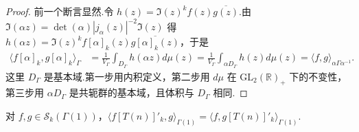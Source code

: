 \begin{proof}

前一个断言显然.令 $h(z)=\Im(z)^kf(z)\overline{g(z)}$.由 $\Im(\alpha z)=\det(\alpha)|j_\alpha(z)|^{-2}\Im(z)$ 得 $h(\alpha z)=\Im(z)^kf[\alpha]_k(z)\overline{g[\alpha]_k(z)}$，于是
\begin{align*}
\langle f[\alpha]_k,g[\alpha]_k\rangle_\Gamma
&=\frac1{V_\Gamma}\int_{D_\Gamma}h(\alpha z)d\mu(z)
=\frac1{V_\Gamma}\int_{\alpha D_\Gamma}h(z)d\mu(z)
=\langle f,g\rangle_{\alpha\Gamma\alpha^{-1}}.
\end{align*}
这里 $D_\Gamma$ 是基本域.第一步用内积定义，第二步用 $d\mu$ 在 $\mathrm{GL}_2(\mathbb R)_+$ 下的不变性，第三步用 $\alpha D_\Gamma$ 是共轭群的基本域，且体积与 $D_\Gamma$ 相同.

\end{proof}

\begin{proposition*}

对 $f,g\in\mathcal S_k(\Gamma(1))$，$\langle f[T(n)]'_k,g\rangle_{\Gamma(1)}=\langle f,g[T(n)]'_k\rangle_{\Gamma(1)}$.

\end{proposition*}

